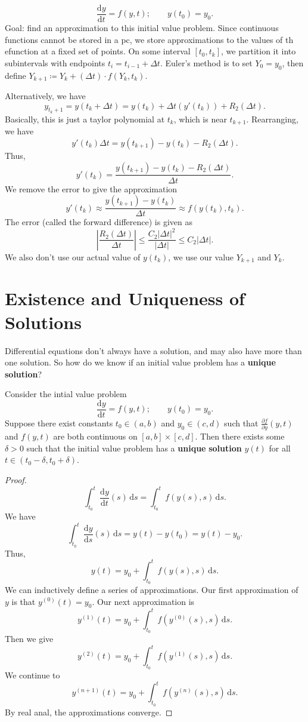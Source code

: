 
\[
	\frac{\mathrm{d}y}{\mathrm{d}t} =f(y,t);\qquad y(t_0)=y_0
.\]
Goal: find an approximation to this initial value problem. Since continuous functions cannot be stored in a pc, we store approximations to the values of th efunction at a fixed set of points. On some interval $[t_0,t_k]$, we partition it into subintervals with endpoints $t_i = t_{i-1}+\Delta t$. Euler's method is to set $Y_0 = y_0$, then define $Y_{k+1}\coloneqq Y_k+(\Delta t)\cdot f(Y_k,t_k)$.

Alternatively, we have
\[
	y_{t_k+1}=y(t_k+\Delta t)=y(t_k)+\Delta t(y'(t_k))+R_2(\Delta t)
.\]
Basically, this is just a taylor polynomial at $t_k$, which is near $t_{k+1}$. Rearranging, we have
\[
	y'(t_k)\Delta t=y(t_{k+1})-y(t_k)-R_2(\Delta t)
.\]
Thus,
\[
	y'(t_k)= \frac{y(t_{k+1})-y(t_k)-R_2(\Delta t)}{\Delta t}
.\]
We remove the error to give the approximation
\[
	y'(t_k)\approx \frac{y(t_{k+1})-y(t_k)}{\Delta t}\approx f(y(t_k),t_k)
.\]
The error (called the forward difference) is given as
\[
	\left|\frac{R_2(\Delta t)}{\Delta t}\right|\leq \frac{C_2 \left| \Delta t \right| ^2}{|\Delta t|}\leq C_2 \left| \Delta t \right| 
.\]
We also don't use our actual value of $y(t_k)$, we use our value $Y_{k+1}$ and $Y_k$.

\section{Existence and Uniqueness of Solutions}
Differential equations don't always have a solution, and may also have more than one solution. So how do we know if an initial value problem has a \textbf{unique} \textbf{solution}?
\begin{theorem}[Picard]\label{thm:2}
	Consider the intial value problem
\[
	\frac{\mathrm{d}y}{\mathrm{d}t} =f(y,t);\qquad y(t_0)=y_0
.\]
Suppose there exist constants $t_0\in(a,b)$ and $y_0\in(c,d)$ such  that $\frac{\partial f}{\partial y} (y,t)$ and $f(y,t)$ are both continuous on $[a,b]\times [c,d]$. Then there exists some $\delta >0$ such that the initial value problem has a \textbf{unique} \textbf{solution} $y(t)$ for all $t\in(t_0-\delta ,t_0+\delta )$.
\end{theorem}
\begin{proof}
	\[
		\int_{t_0}^{t} \frac{\mathrm{d}y}{\mathrm{d}t} (s) \,\mathrm{d} s=\int_{t_0}^{t} f(y(s),s) \,\mathrm{d} s
	.\]
	We have
	\[
		\int_{t_0}^{t} \frac{\mathrm{d}y}{\mathrm{d}s} (s) \,\mathrm{d} s=y(t)-y(t_0)=y(t)-y_0
	.\]
	Thus,
	\[
		y(t)=y_0+\int_{t_0}^{t} f(y(s),s) \,\mathrm{d} s
	.\]
	We can inductively define a series of approximations. Our first approximation of $y$ is that
	$y^{(0)}(t)=y_0$. Our next approximation is
	\[
		y^{(1)}(t)=y_0+\int_{t_0}^{t} f\left( y^{(0)}(s),s \right)  \,\mathrm{d} s
	.\]
	Then we give
	\[
		y^{(2)}(t)=y_0+\int_{t_0}^{t} f\left( y^{(1)}(s),s \right)  \,\mathrm{d} s
	.\]
	We continue to
	 \[
		y^{(n+1)}(t)=y_0+\int_{t_0}^{t} f\left( y^{(n)}(s),s \right)  \,\mathrm{d} s
	.\]
	By real anal, the approximations converge.
\end{proof}

